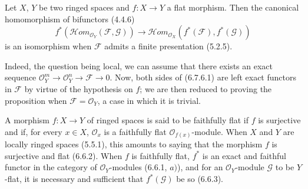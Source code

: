 \begin{env}[6.7.6]
\label{0.6.7.6}
Let $X$, $Y$ be two ringed spaces and $f:X\to Y$ a flat morphism. Then
the canonical homomorphism of bifunctors (4.4.6)
\[
  f^*(\mathcal{H}om_{\mathcal O_Y}(\mathcal F,\mathcal G))
  \longrightarrow
  \mathcal{H}om_{\mathcal O_X}(f^*(\mathcal F),f^*(\mathcal G))
  \tag{6.7.6.1}
  \label{0.6.7.6.1}
\]
is an isomorphism when $\mathcal F$ admits a finite presentation
(5.2.5).

Indeed, the question being local, we can assume that there exists an exact
sequence $\mathcal O_Y^m\to\mathcal O_Y^n\to\mathcal F\to0$. Now, both
sides of (6.7.6.1) are left exact functors in $\mathcal F$ by
virtue of the hypothesis on $f$; we are then reduced to proving the proposition
when $\mathcal F=\mathcal O_Y$, a case in which it is trivial.
\end{env}

\begin{env}[6.7.8]
\label{0.6.7.8}
A morphism $f:X\to Y$ of ringed spaces is said to be faithfully flat if
$f$ is surjective and if, for every $x\in X$, $\mathcal O_x$ is a
faithfully flat $\mathcal O_{f(x)}$-module. When $X$ and $Y$ are
locally ringed spaces (5.5.1), this amounts to saying that the
morphism $f$ is surjective and flat (6.6.2). When $f$ is faithfully flat,
$f^*$ is an exact and faithful functor in the category of
$\mathcal O_Y$-modules (6.6.1, $a)$), and for an $\mathcal O_Y$-module
$\mathcal G$ to be $Y$-flat, it is necessary and sufficient that $f^*(\mathcal G)$ be
so (6.6.3).
\end{env}

